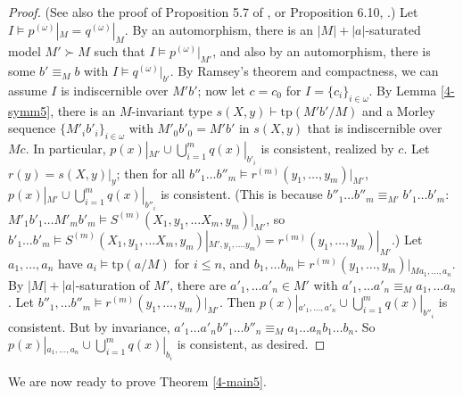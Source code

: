 \documentclass[12pt]{amsart}
\theoremstyle{definition}
\begin{document}
\begin{proof}
    (See also the proof of Proposition 5.7 of \cite{NSOP2}, or Proposition 6.10, \cite{KR17}.) Let $I \models p^{(\omega)}|_{M} = q^{(\omega)}|_{M}$. By an automorphism, there is an $|M|+|a|$-saturated model $M' \succ M$ such that $I \models p^{(\omega)}|_{M'}$, and also by an automorphism, there is some $b' \equiv_{M}b$ with $I \models q^{(\omega)}|_{b'}$. By Ramsey's theorem and compactness, we can assume $I$ is indiscernible over $M'b'$; now let $c=c_{0}$ for $I = \{c_{i}\}_{i \in \omega}$. By Lemma \ref{4-symm5}, there is an $M$-invariant type $s(X, y) \vdash \mathrm{tp}(M'b'/M)$ and a Morley sequence $\{M'_{i}b'_{i}\}_{i \in \omega}$ with $M'_{0}b'_{0}=M'b'$ in $s(X,y)$ that is indiscernible over $Mc$. In particular, $p(x)|_{M'}\cup \bigcup^{m}_{i=1} q(x)|_{b'_{i}}$ is consistent, realized by $c$. Let $r(y) = s(X, y)|_{y}$; then for all $b''_{1} \ldots b''_{m} \models r^{(m)}(y_{1}, \ldots, y_{m})|_{M'}$, $p(x)|_{M'}\cup \bigcup^{m}_{i=1} q(x)|_{b''_{i}}$ is consistent. (This is because $b''_{1} \ldots b''_{m} \equiv_{M'} b'_{1} \ldots b'_{m}$: $ M'_{1}b'_{1} \ldots M'_{m}b'_{m} \models S^{(m)}(X_{1}, y_{1}, \ldots X_{m}, y_{m})|_{M'}$, so $b'_{1} \ldots b'_{m} \models S^{(m)}(X_{1}, y_{1}, \ldots X_{m}, y_{m})|_{M', y_{1}, \ldots. y_{m}})=r^{(m)}(y_{1}, \ldots, y_{m})|_{M'}$.) Let $a_{1}, \ldots, a_{n}$ have $a_{i} \models \mathrm{tp}(a/M)$ for $i \leq n$, and $b_{1}, \ldots b_{m} \models r^{(m)}(y_{1}, \ldots, y_{m})|_{Ma_{1}, \ldots, a_{n}}$. By $|M|+|a|$-saturation of $M'$, there are $a'_{1}, \ldots a'_{n} \in M'$ with $a'_{1}, \ldots a'_{n} \equiv_{M} a_{1}, \ldots a_{n}$. Let $b''_{1}, \ldots b''_{m} \models r^{(m)}(y_{1}, \ldots, y_{m})|_{M'}$. Then $p(x)|_{a'_1, \ldots, a'_n}\cup \bigcup^{m}_{i=1} q(x)|_{b''_{i}}$ is consistent. But by invariance, $a'_{1} \ldots a'_{n} b''_{1} \ldots b''_{n} \equiv_{M} a_{1} \ldots a_{n} b_{1} \ldots b_{n}$. So $p(x)|_{a_1, \ldots, a_n}\cup \bigcup^{m}_{i=1} q(x)|_{b_{i}}$ is consistent, as desired. 
\end{proof}


We are now ready to prove Theorem \ref{4-main5}.
\end{document}
